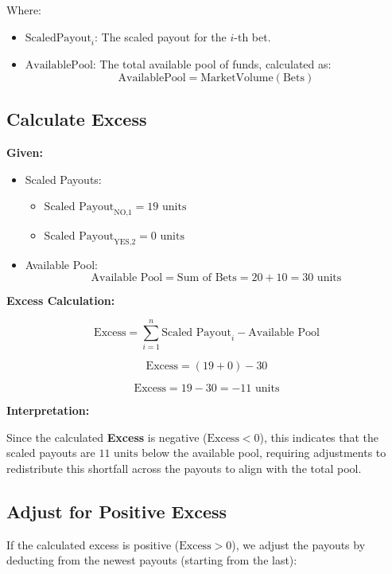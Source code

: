 \documentclass{article}
\begin{document}
Where:
\begin{itemize}
    \item \( \text{ScaledPayout}_i \): The scaled payout for the \(i\)-th bet.
    \item \( \text{AvailablePool} \): The total available pool of funds, calculated as:
    \[
    \text{AvailablePool} = \text{MarketVolume}(\text{Bets})
    \]
\end{itemize}


\subsection*{Calculate Excess}

\textbf{Given:}

\begin{itemize}
    \item Scaled Payouts:
    \begin{itemize}
        \item \( \text{Scaled Payout}_{\text{NO,1}} = 19 \text{ units} \)
        \item \( \text{Scaled Payout}_{\text{YES,2}} = 0 \text{ units} \)
    \end{itemize}
    \item Available Pool:
    \[
    \text{Available Pool} = \text{Sum of Bets} = 20 + 10 = 30 \text{ units}
    \]
\end{itemize}

\textbf{Excess Calculation:}

\[
\text{Excess} = \sum_{i=1}^{n} \text{Scaled Payout}_i - \text{Available Pool}
\]

\[
\text{Excess} = (19 + 0) - 30
\]

\[
\text{Excess} = 19 - 30 = -11 \text{ units}
\]

\textbf{Interpretation:}

Since the calculated \textbf{Excess} is negative (\( \text{Excess} < 0 \)), this indicates that the scaled payouts are \( 11 \text{ units} \) below the available pool, requiring adjustments to redistribute this shortfall across the payouts to align with the total pool.

\subsection*{Adjust for Positive Excess}

If the calculated excess is positive (\(\text{Excess} > 0\)), we adjust the payouts by deducting from the newest payouts (starting from the last):
\end{document}
